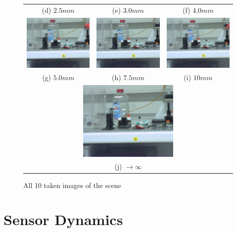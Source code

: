 \documentclass[
a4paper,     %
12pt         %
]{scrartcl}  %
\begin{document}
\begin{figure}
\begin{tabular}{ccc}
(d) $2.5mm$& (e) $3.0mm$ & (f) $4.0mm$\\[6pt]
 \includegraphics[width=48mm]{./Bildg_Messtechnik_Lab/Autofokus/images/image_05.png} & \includegraphics[width=48mm]{./Bildg_Messtechnik_Lab/Autofokus/images/image_07_5.png} & \includegraphics[width=48mm]{./Bildg_Messtechnik_Lab/Autofokus/images/image_10.png}\\
(g) $5.0mm$ & (h) $7.5mm$ & (i) $10mm$\\[6pt]
 \multicolumn{3}{c}{\includegraphics[width=48mm]{./Bildg_Messtechnik_Lab/Autofokus/images/image_inf.png}} \\[6pt]
 \multicolumn{3}{c}{(j) $\rightarrow\infty$}
\end{tabular}
\caption{All 10 taken images of the scene}
\label{fig:alltakenimages}
\end{figure}

\pagebreak

\section{Sensor Dynamics}
\end{document}
